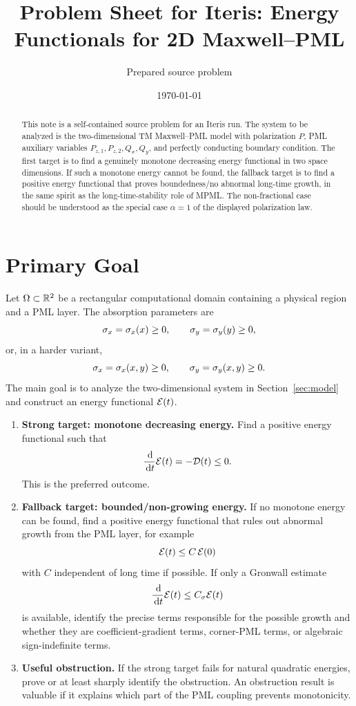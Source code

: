 \documentclass[UTF8,a4paper,12pt]{ctexart}
\title{Problem Sheet for Iteris: Energy Functionals for 2D Maxwell--PML}
\author{Prepared source problem}
\date{\today}
\begin{document}
\maketitle

\begin{abstract}
This note is a self-contained source problem for an Iteris run.  The system to be analyzed is the two-dimensional TM Maxwell--PML model with polarization \(P\), PML auxiliary variables \(P_{z,1},P_{z,2},Q_x,Q_y\), and perfectly conducting boundary condition.  The first target is to find a genuinely monotone decreasing energy functional in two space dimensions.  If such a monotone energy cannot be found, the fallback target is to find a positive energy functional that proves boundedness/no abnormal long-time growth, in the same spirit as the long-time-stability role of MPML.  The non-fractional case should be understood as the special case \(\alpha=1\) of the displayed polarization law.
\end{abstract}

\section{Primary Goal}

Let \(\Omega\subset\mathbb{R}^2\) be a rectangular computational domain containing a physical region and a PML layer.  The absorption parameters are
\[
  \sigma_x=\sigma_x(x)\ge0,\qquad \sigma_y=\sigma_y(y)\ge0,
\]
or, in a harder variant,
\[
  \sigma_x=\sigma_x(x,y)\ge0,\qquad \sigma_y=\sigma_y(x,y)\ge0.
\]
The main goal is to analyze the two-dimensional system in Section~\ref{sec:model} and construct an energy functional \(\mathcal{E}(t)\).

\begin{enumerate}
\item \textbf{Strong target: monotone decreasing energy.}
Find a positive energy functional such that
\[
  \frac{\,\mathrm{d}}{\,\mathrm{d} t}\mathcal{E}(t)=-\mathcal{D}(t)\le0.
\]
This is the preferred outcome.
\item \textbf{Fallback target: bounded/non-growing energy.}
If no monotone energy can be found, find a positive energy functional that rules out abnormal growth from the PML layer, for example
\[
  \mathcal{E}(t)\le C\,\mathcal{E}(0)
\]
with \(C\) independent of long time if possible.  If only a Gronwall estimate
\[
  \frac{\,\mathrm{d}}{\,\mathrm{d} t}\mathcal{E}(t)\le C_\sigma\mathcal{E}(t)
\]
is available, identify the precise terms responsible for the possible growth and whether they are coefficient-gradient terms, corner-PML terms, or algebraic sign-indefinite terms.
\item \textbf{Useful obstruction.}
If the strong target fails for natural quadratic energies, prove or at least sharply identify the obstruction.  An obstruction result is valuable if it explains which part of the PML coupling prevents monotonicity.
\end{enumerate}
\end{document}
